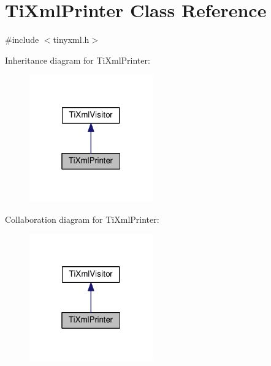 \hypertarget{class_ti_xml_printer}{}\section{Ti\+Xml\+Printer Class Reference}
\label{class_ti_xml_printer}


{\ttfamily \#include $<$tinyxml.\+h$>$}



Inheritance diagram for Ti\+Xml\+Printer\+:
\nopagebreak
\begin{figure}[H]
\begin{center}
\leavevmode
\includegraphics[width=151pt]{class_ti_xml_printer__inherit__graph}
\end{center}
\end{figure}


Collaboration diagram for Ti\+Xml\+Printer\+:
\nopagebreak
\begin{figure}[H]
\begin{center}
\leavevmode
\includegraphics[width=151pt]{class_ti_xml_printer__coll__graph}
\end{center}
\end{figure}
